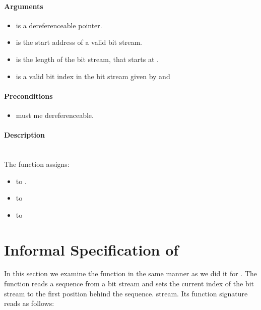 \paragraph{Arguments}
\begin{itemize}
   \item  {} is a dereferenceable pointer.
   \item {} is  the start address of a valid bit stream.
   \item {} is the length of the bit stream, that starts at .
   \item {} is a valid bit index in the bit stream given by  and 
\end{itemize}

\paragraph{Preconditions}
\begin{itemize}
    \item  {} must me dereferenceable.
\end{itemize}

\paragraph{Description}\hfill\\\hfill
The function \init assigns:
\begin{itemize}
    \item {}  to .
    \item {} to 
    \item {} to 
\end{itemize}


\clearpage

\section{Informal Specification of }

In this section we examine the function \peeknext in the same manner as we did it for \init.
The function \peeknext reads a sequence from a bit stream  and sets the current index of the bit stream  to the first position behind the sequence.
stream. Its function signature reads as follows:


